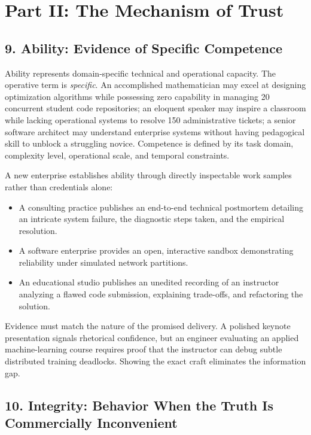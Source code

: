 \section*{Part II: The Mechanism of Trust}

\subsection*{9. Ability: Evidence of Specific Competence}

Ability represents domain-specific technical and operational capacity. The operative term is \emph{specific}. An accomplished mathematician may excel at designing optimization algorithms while possessing zero capability in managing 20 concurrent student code repositories; an eloquent speaker may inspire a classroom while lacking operational systems to resolve 150 administrative tickets; a senior software architect may understand enterprise systems without having pedagogical skill to unblock a struggling novice. Competence is defined by its task domain, complexity level, operational scale, and temporal constraints.

A new enterprise establishes ability through directly inspectable work samples rather than credentials alone:
\begin{itemize}
\item A consulting practice publishes an end-to-end technical postmortem detailing an intricate system failure, the diagnostic steps taken, and the empirical resolution.
\item A software enterprise provides an open, interactive sandbox demonstrating reliability under simulated network partitions.
\item An educational studio publishes an unedited recording of an instructor analyzing a flawed code submission, explaining trade-offs, and refactoring the solution.
\end{itemize}

Evidence must match the nature of the promised delivery. A polished keynote presentation signals rhetorical confidence, but an engineer evaluating an applied machine-learning course requires proof that the instructor can debug subtle distributed training deadlocks. Showing the exact craft eliminates the information gap.

\subsection*{10. Integrity: Behavior When the Truth Is Commercially Inconvenient}

